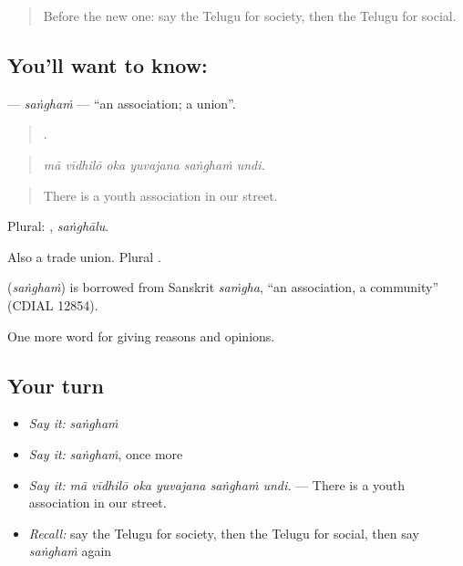 \label{lesson:TE-C408-sangham}



\begin{quote}
Before the new one: say the Telugu for society, then the Telugu for social.
\end{quote}

\subsection*{You'll want to know: }
\textbf{} — \emph{saṅghaṁ} — \textquotedblleft{}an association; a union\textquotedblright{}.

\begin{quote}
     .
\end{quote}

\begin{quote}
\emph{mā vīdhilō oka yuvajana saṅghaṁ undi.}
\end{quote}

\begin{quote}
There is a youth association in our street.
\end{quote}

Plural: , \emph{saṅghālu}.

Also a trade union. Plural .

\begin{cousinweb}
\textbf{} (\emph{saṅghaṁ}) is borrowed from Sanskrit \emph{saṁgha}, \textquotedblleft{}an association, a community\textquotedblright{} (CDIAL 12854).
\end{cousinweb}

\begin{grammarlens}[title={What you've built}]
One more word for giving reasons and opinions.
\end{grammarlens}

\subsection*{Your turn}
\begin{itemize}
\raggedright
  \item \emph{Say it:} \emph{saṅghaṁ}
  \item \emph{Say it:} \emph{saṅghaṁ}, once more
  \item \emph{Say it:} \emph{mā vīdhilō oka yuvajana saṅghaṁ undi.} — There is a youth association in our street.
  \item \emph{Recall:} say the Telugu for society, then the Telugu for social, then say \emph{saṅghaṁ} again
\end{itemize}

